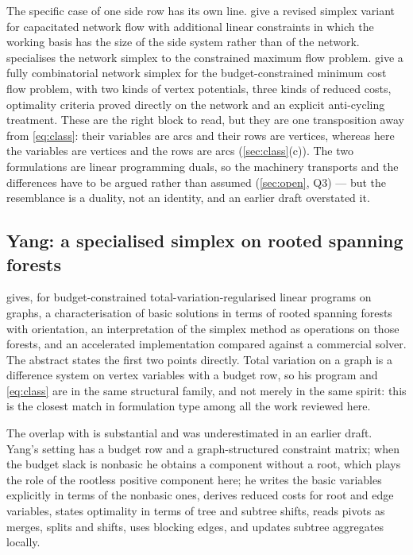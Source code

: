 The specific case of one side row has its own line. \citet{ChenSaigal1977} give
a revised simplex variant for capacitated network flow with additional linear
constraints in which the working basis has the size of the side system rather
than of the network. \citet{Caliskan2011} specialises the network simplex to
the constrained maximum flow problem. \citet{HolzhauserEtAl2017} give a fully
combinatorial network simplex for the budget-constrained minimum cost flow
problem, with two kinds of vertex potentials, three kinds of reduced costs,
optimality criteria proved directly on the network and an explicit anti-cycling
treatment. These are the right block to read, but they are one
transposition away from \eqref{eq:class}: their variables are arcs and their
rows are vertices, whereas here the variables are vertices and the rows are arcs
(\cref{sec:class}(c)). The two formulations are linear programming duals, so the
machinery transports and the differences have to be argued rather than assumed
(\cref{sec:open}, Q3) --- but the resemblance is a duality, not an identity, and
an earlier draft overstated it.

\subsection{Yang: a specialised simplex on rooted spanning forests}

\citet{Yang2026} gives, for budget-constrained total-variation-regularised
linear programs on graphs, a characterisation of basic solutions in terms of
rooted spanning forests with orientation, an interpretation of the simplex
method as operations on those forests, and an accelerated implementation
compared against a commercial solver. The abstract states the first two points
directly. Total variation on a graph is a difference system on vertex variables
with a budget row, so his program and \eqref{eq:class} are in the same
structural family, and not merely in the same spirit: this is the closest match
in formulation type among all the work reviewed here.

The overlap with \FS{} is substantial and was underestimated in an earlier
draft. Yang's setting has a budget row and a graph-structured constraint matrix;
when the budget slack is nonbasic he obtains a component without a root, which
plays the role of the rootless positive component here; he writes the basic
variables explicitly in terms of the nonbasic ones, derives reduced costs for
root and edge variables, states optimality in terms of tree and subtree shifts,
reads pivots as merges, splits and shifts, uses blocking edges, and updates
subtree aggregates locally.

